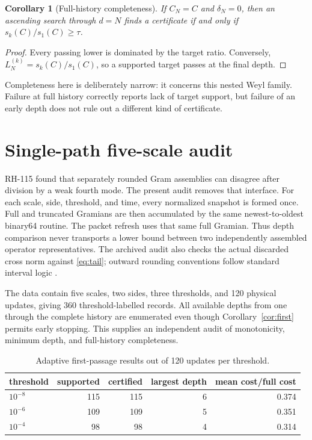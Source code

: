 \documentclass[12pt]{article}
\newtheorem{corollary}[theorem]{Corollary}
\begin{document}
\begin{corollary}[Full-history completeness]\label{cor:complete}
If $C_N=C$ and $\delta_N=0$, then an ascending search through $d=N$ finds a
certificate if and only if $s_k(C)/s_1(C)\geq\tau$.
\end{corollary}
\begin{proof}
Every passing lower is dominated by the target ratio.  Conversely,
$L_N^{(k)}=s_k(C)/s_1(C)$, so a supported target passes at the final depth.
\end{proof}

Completeness here is deliberately narrow: it concerns this nested Weyl
family.  Failure at full history correctly reports lack of target support,
but failure of an early depth does not rule out a different kind of
certificate.

\section{Single-path five-scale audit}
RH-115 found that separately rounded Gram assemblies can disagree after
division by a weak fourth mode.  The present audit removes that interface.
For each scale, side, threshold, and time, every normalized snapshot is
formed once.  Full and truncated Gramians are then accumulated by the same
newest-to-oldest binary64 routine.  The packet refresh uses that same full
Gramian.  Thus depth comparison never transports a lower bound between two
independently assembled operator representatives.  The archived audit also
checks the actual discarded cross norm against \eqref{eq:tail}; outward
rounding conventions follow standard interval logic \citep{Moore1966}.

The data contain five scales, two sides, three thresholds, and 120 physical
updates, giving 360 threshold-labelled records.  All available depths from
one through the complete history are enumerated even though
Corollary~\ref{cor:first} permits early stopping.  This supplies an independent
audit of monotonicity, minimum depth, and full-history completeness.

\begin{table}[h]
\centering
\begin{tabular}{lrrrr}
\toprule
threshold & supported & certified & largest depth & mean cost/full cost\\
\midrule
$10^{-8}$ & 115 & 115 & 6 & 0.374\\
$10^{-6}$ & 109 & 109 & 5 & 0.351\\
$10^{-4}$ & 98  & 98  & 4 & 0.314\\
\bottomrule
\end{tabular}
\caption{Adaptive first-passage results out of 120 updates per threshold.}
\end{table}
\end{document}
